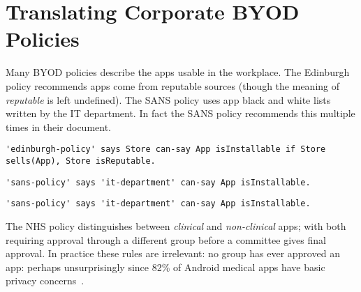 \documentclass{easychair}
\begin{document}
\section{Translating Corporate BYOD Policies}
\label{sec:translation}

Many BYOD policies describe the apps usable in the workplace.
The Edinburgh policy recommends apps come from reputable sources (though the meaning of \emph{reputable} is left undefined). 
The SANS policy uses app black and white lists written by the IT department.
In fact the SANS policy recommends this multiple times in their document.
\begin{lstlisting}[title={\footnotesize\textbf{Edinburgh}:~\itshape ``Only download applications (‘apps’) or other software from reputable sources.''}]
'edinburgh-policy' says Store can-say App isInstallable if Store sells(App), Store isReputable.
\end{lstlisting}
\begin{lstlisting}[title={\footnotesize\textbf{SANS}:~\itshape ``The IT Department maintains a list of allowed and unauthorised applications and makes them available to users on the intranet.''}]
'sans-policy' says 'it-department' can-say App isInstallable.
\end{lstlisting}
\begin{lstlisting}[title={\footnotesize\textbf{SANS}:~\itshape ``Only approved third party applications can be
installed on handhelds. The approved list can be
obtained by contacting the IT department, or should be
available on the intranet.''}]
'sans-policy' says 'it-department' can-say App isInstallable.
\end{lstlisting}
The NHS policy distinguishes between \emph{clinical} and \emph{non-clinical} apps;
    with both requiring approval through a different group before a committee gives final approval.
In practice these rules are irrelevant: no group has ever approved an app: perhaps unsurprisingly since 82\% of Android medical apps have basic privacy concerns~\cite{Blenner:2016ja}.
\end{document}
